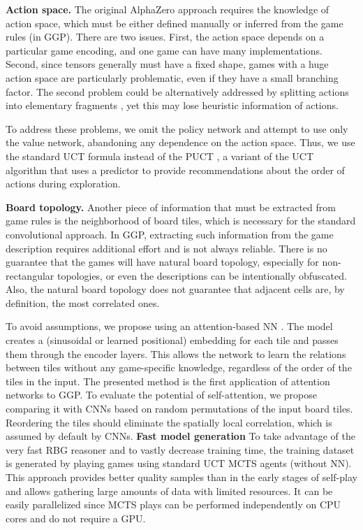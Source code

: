 \documentclass[letterpaper]{article} %
\begin{document}
\textbf{Action space.}
The original AlphaZero approach requires the knowledge of action space, which must be either defined manually or inferred from the game rules (in GGP).
There are two issues.
First, the action space depends on a particular game encoding, and one game can have many implementations. Second, since tensors generally must have a fixed shape, games with a huge action space are particularly problematic, even if they have a small branching factor.
The second problem could be alternatively addressed by splitting actions into elementary fragments \cite{Kowalski2022SplitMoves}, yet this may lose heuristic information of actions.

To address these problems, we omit the policy network and attempt to use only the value network, abandoning any dependence on the action space. Thus, we use the standard UCT formula instead of the PUCT \cite{Rosin2011}, a variant of the UCT algorithm that uses a predictor to provide recommendations about the order of actions during exploration.



\textbf{Board topology.}
Another piece of information that must be extracted from game rules is the neighborhood of board tiles, which is necessary for the standard convolutional approach.
In GGP, extracting such information from the game description requires additional effort and is not always reliable.
There is no guarantee that the games will have natural board topology, especially for non-rectangular topologies, or even the descriptions can be intentionally obfuscated.
Also, the natural board topology does not guarantee that adjacent cells are, by definition, the most correlated ones.

To avoid assumptions, we propose using an attention-based NN \cite{vaswani2017attention}. The model creates a (sinusoidal or learned positional) embedding for each tile and passes them through the encoder layers. This allows the network to learn the relations between tiles without any game-specific knowledge, regardless of the order of the tiles in the input. The presented method is the first application of attention networks to GGP.
\vspace{-6.85mm}
\vspace{-1.73mm}
To evaluate the potential of self-attention, we propose comparing it with CNNs based on random permutations of the input board tiles. Reordering the tiles should eliminate the spatially local correlation, which is assumed by default by CNNs.  \textbf{Fast model generation}
To take advantage of the very fast RBG reasoner and to vastly decrease training time, the training dataset is generated by playing games using standard UCT MCTS agents (without NN). This approach provides better quality samples than in the early stages of self-play and allows gathering large amounts of data with limited resources. It can be easily parallelized since MCTS plays can be performed independently on CPU cores and do not require a GPU.
\end{document}
